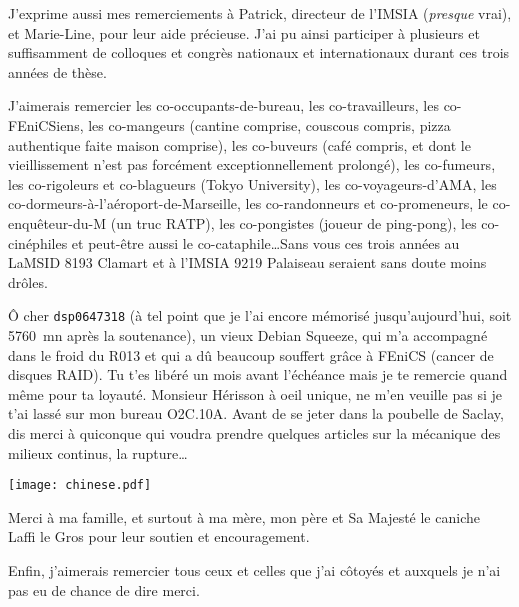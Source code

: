 J'exprime aussi mes remerciements à Patrick, directeur de l'IMSIA (\emph{presque} vrai), et Marie-Line, pour leur aide précieuse. J'ai pu ainsi participer à plusieurs et suffisamment de colloques et congrès nationaux et internationaux durant ces trois années de thèse. 

\vspace{0.2cm}

J'aimerais remercier les co-occupants-de-bureau, les co-travailleurs, les co-FEniCSiens, les co-mangeurs (cantine comprise, couscous compris, pizza authentique faite maison comprise), les co-buveurs (café compris, et dont le vieillissement n'est pas forcément exceptionnellement prolongé), les co-fumeurs, les co-rigoleurs et co-blagueurs (Tokyo University), les co-voyageurs-d'AMA, les co-dormeurs-à-l'aéroport-de-Marseille, les co-randonneurs et co-promeneurs, le co-enquêteur-du-M (un truc RATP), les co-pongistes (joueur de ping-pong), les co-cinéphiles et peut-être aussi le co-cataphile\ldots Sans vous ces trois années au LaMSID 8193 Clamart et à l'IMSIA 9219 Palaiseau seraient sans doute moins drôles.

\vspace{0.2cm}

Ô cher \texttt{dsp0647318} (à tel point que je l'ai encore mémorisé jusqu'aujourd'hui, soit \SI{5760}{mn} après la soutenance), un vieux Debian Squeeze, qui m'a accompagné dans le froid du R013 et qui a dû beaucoup souffert grâce à FEniCS (cancer de disques RAID). Tu t'es libéré un mois avant l'échéance mais je te remercie quand même pour ta loyauté. Monsieur Hérisson à oeil unique, ne m'en veuille pas si je t'ai lassé sur mon bureau O2C.10A. Avant de se jeter dans la poubelle de Saclay, dis merci à quiconque qui voudra prendre quelques articles sur la mécanique des milieux continus, la rupture\ldots

\vspace{0.2cm}

\indent\hspace{-0.085cm}\texttt{[image: chinese.pdf]}

{\footnotesize
Merci à ma famille, et surtout à ma mère, mon père et Sa Majesté le caniche Laffi le Gros pour leur soutien et encouragement.}

\vspace{0.2cm}

Enfin, j'aimerais remercier tous ceux et celles que j'ai côtoyés et auxquels je n'ai pas eu de chance de dire merci.